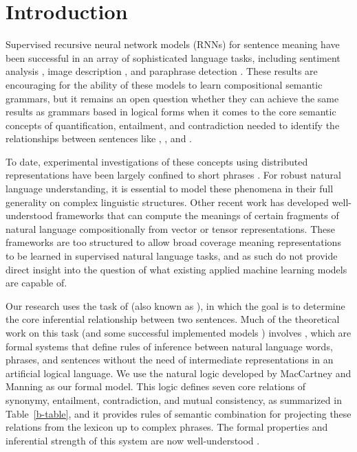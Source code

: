 \section{Introduction}\label{sec:intro}

Supervised recursive neural network models (RNNs) for sentence meaning
have been successful in an array of sophisticated language tasks,
including sentiment analysis \cite{socher2011semi,socher2013acl1},
image description \cite{sochergrounded}, and paraphrase detection
\cite{Socher-etal:2011:Paraphrase}. These results are encouraging for
the ability of these models to learn compositional semantic grammars,
but it remains an open question whether they can achieve the same
results as grammars based in logical forms
\cite{Warren:Pereira:1982,Zelle:Mooney:1996,ZetCol:2005,LiangJordan:2013}
when it comes to the core semantic concepts of quantification,
entailment, and contradiction needed to identify the relationships
between sentences like , , and . 
  
To date, experimental investigations of these concepts using 
distributed representations have been largely confined to short phrases
\cite{Mitchell:Lapata:2010,Grefenstette-etal:2011,baroni2012entailment}.
For robust natural language understanding, it is essential to model
these phenomena in their full generality on complex linguistic
structures. Other recent work \cite{grefenstette2013towards,rocktaschellow} has
developed well-understood frameworks that can compute the meanings of 
certain fragments of natural language compositionally from vector or
tensor representations. These frameworks are too structured to allow broad
coverage meaning representations to be learned in
supervised natural language tasks, and as such do not provide direct insight
into the question of what existing applied machine learning models are 
capable of.


Our research uses the task of  (also known as 
\cite{dagan2006pascal}), in which the goal is to determine the core
inferential relationship between two sentences. Much of the
theoretical work on this task (and some successful implemented models
\cite{maccartney2009extended,watanabe2012latent}) involves , which are formal systems that define rules of inference
between natural language words, phrases, and sentences without the
need of intermediate representations in an artificial logical
language. We use the natural logic developed by MacCartney and Manning 
as our formal model. This logic defines seven core relations of synonymy, 
entailment, contradiction, and mutual consistency, as summarized in
Table~\ref{b-table}, and it provides rules of semantic combination for
projecting these relations from the lexicon up to complex phrases. The
formal properties and inferential strength of this system are now
well-understood \cite{Icard:Moss:2013,Icard:Moss:2013:LILT}.


